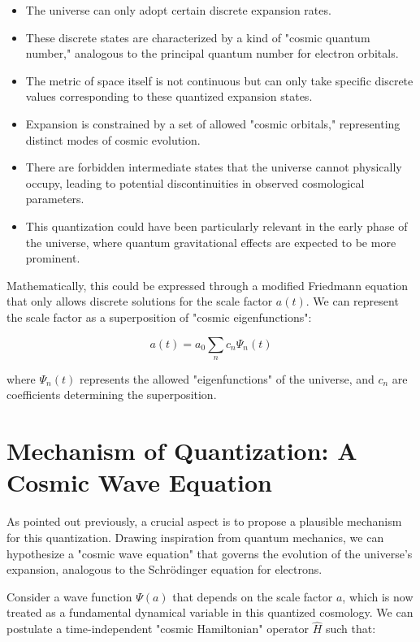 \documentclass[12pt,a4paper]{article}
\begin{document}
	\begin{itemize}
		\item The universe can only adopt certain discrete expansion rates.
		\item These discrete states are characterized by a kind of "cosmic quantum number," analogous to the principal quantum number for electron orbitals.
		\item The metric of space itself is not continuous but can only take specific discrete values corresponding to these quantized expansion states.
		\item Expansion is constrained by a set of allowed "cosmic orbitals," representing distinct modes of cosmic evolution.
		\item There are forbidden intermediate states that the universe cannot physically occupy, leading to potential discontinuities in observed cosmological parameters.
		\item This quantization could have been particularly relevant in the early phase of the universe, where quantum gravitational effects are expected to be more prominent.
	\end{itemize}
	
	Mathematically, this could be expressed through a modified Friedmann equation that only allows discrete solutions for the scale factor $a(t)$.  We can represent the scale factor as a superposition of "cosmic eigenfunctions":
	
	\begin{equation}
		a(t) = a_0 \sum_n c_n \Psi_n(t)
	\end{equation}
	
	where $\Psi_n(t)$ represents the allowed "eigenfunctions" of the universe, and $c_n$ are coefficients determining the superposition.
	
	\section{Mechanism of Quantization: A Cosmic Wave Equation}
	
	As pointed out previously, a crucial aspect is to propose a plausible mechanism for this quantization.  Drawing inspiration from quantum mechanics, we can hypothesize a "cosmic wave equation" that governs the evolution of the universe's expansion, analogous to the Schrödinger equation for electrons.
	
	Consider a wave function $\Psi(a)$ that depends on the scale factor $a$, which is now treated as a fundamental dynamical variable in this quantized cosmology. We can postulate a time-independent "cosmic Hamiltonian" operator $\hat{H}$ such that:
	
\end{document}
